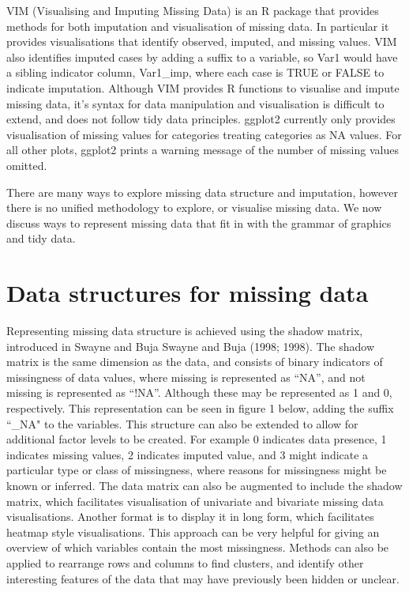 \documentclass[]{article}
\begin{document}
VIM (Visualising and Imputing Missing Data) is an R package that
provides methods for both imputation and visualisation of missing data.
In particular it provides visualisations that identify observed,
imputed, and missing values. VIM also identifies imputed cases by adding
a suffix to a variable, so Var1 would have a sibling indicator column,
Var1\_imp, where each case is TRUE or FALSE to indicate imputation.
Although VIM provides R functions to visualise and impute missing data,
it's syntax for data manipulation and visualisation is difficult to
extend, and does not follow tidy data principles. ggplot2 currently only
provides visualisation of missing values for categories treating
categories as NA values. For all other plots, ggplot2 prints a warning
message of the number of missing values omitted.

There are many ways to explore missing data structure and imputation,
however there is no unified methodology to explore, or visualise missing
data. We now discuss ways to represent missing data that fit in with the
grammar of graphics and tidy data.

\section{Data structures for missing
data}\label{data-structures-for-missing-data}

Representing missing data structure is achieved using the shadow matrix,
introduced in Swayne and Buja Swayne and Buja (1998; 1998). The shadow
matrix is the same dimension as the data, and consists of binary
indicators of missingness of data values, where missing is represented
as ``NA'', and not missing is represented as ``!NA''. Although these may
be represented as 1 and 0, respectively. This representation can be seen
in figure 1 below, adding the suffix ``\_NA" to the variables. This
structure can also be extended to allow for additional factor levels to
be created. For example 0 indicates data presence, 1 indicates missing
values, 2 indicates imputed value, and 3 might indicate a particular
type or class of missingness, where reasons for missingness might be
known or inferred. The data matrix can also be augmented to include the
shadow matrix, which facilitates visualisation of univariate and
bivariate missing data visualisations. Another format is to display it
in long form, which facilitates heatmap style visualisations. This
approach can be very helpful for giving an overview of which variables
contain the most missingness. Methods can also be applied to rearrange
rows and columns to find clusters, and identify other interesting
features of the data that may have previously been hidden or unclear.
\end{document}
